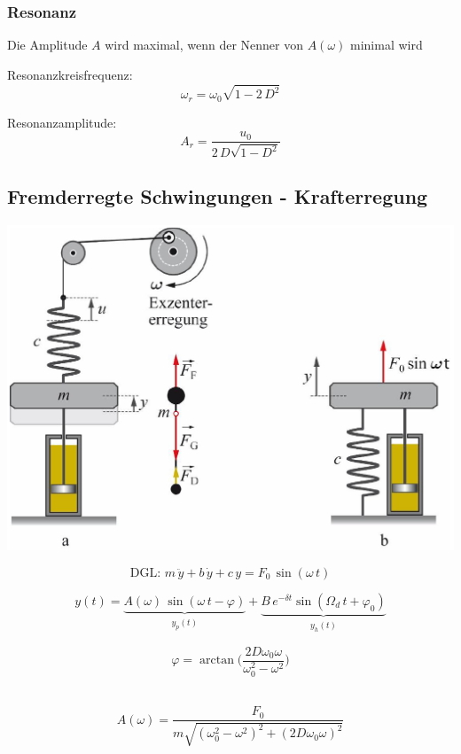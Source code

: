 \subsubsection{Resonanz}

Die Amplitude $A$ wird maximal, wenn der Nenner von $A(\omega)$ minimal wird 

\begin{minipage}{0.48\linewidth}
    \begin{center}
        Resonanzkreisfrequenz:
        $$ \boxed{ \omega_r = \omega_0 \sqrt{1 - 2 \, D^2} } $$
    \end{center}
\end{minipage}
\hfill
\begin{minipage}{0.48\linewidth}
    \begin{center}
        Resonanzamplitude:
        $$ \boxed{ A_r = \frac{u_0}{2 \, D \sqrt{1 - D^2}} }$$
    \end{center}    
\end{minipage}



\subsection{Fremderregte Schwingungen - Krafterregung}
\includegraphics[width=0.75\linewidth]{Bilder/Wellen-Optik/krafterregung} 

$$ \boxed{ \text{DGL: } m \, \ddot{y} + b \, \dot{y} + c \, y = F_0 \, \sin(\omega \, t)  } $$  


$$ y(t) = \underbrace{ A(\omega) \, \sin(\omega \, t - \varphi) }_{\substack{y_p(t)}} + \underbrace{ B \, e^{- \delta t} \sin(\Omega_d \, t + \varphi_0)}_{\substack{y_h(t)}} $$

\begin{minipage}{0.3\linewidth}
$$ \boxed{ \varphi = \arctan \Big( \frac{2 D \omega_0 \omega}{\omega_0^2 - \omega^2}   \Big) } $$ \\
\end{minipage}
\hfill
\begin{minipage}{0.68\linewidth}
$$ \boxed{ A(\omega) = \frac{F_0}{m \sqrt{(\omega_0^2- \omega^2)^2 + (2 D \omega_0 \omega)^2 } } }$$ \\
\end{minipage}


